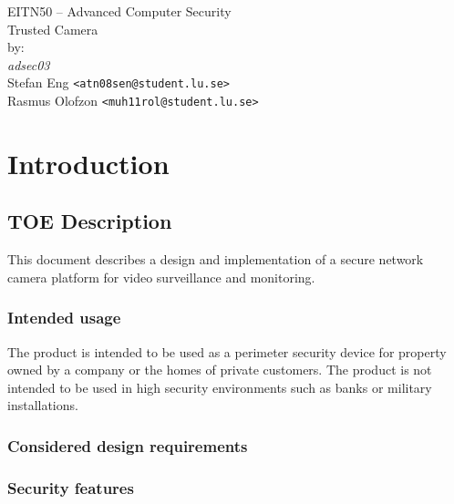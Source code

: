 \documentclass[10pt]{article}
\begin{document}

  \thispagestyle{empty}
  \vspace*{3cm}
  \begin{center}
    \huge{EITN50 -- Advanced Computer Security} \\
    \vspace{0.3cm}
    \LARGE{Trusted Camera} \\
    \vspace{1cm}
    \large{by: \\ \vspace{0.2cm}
	\textit{adsec03} \\
        Stefan Eng \texttt{<atn08sen@student.lu.se>} \\
        Rasmus Olofzon \texttt{<muh11rol@student.lu.se>}
        } \\
  \end{center}


  \newpage

  \section{Introduction}

    \subsection{TOE Description}

      This document describes a design and implementation of a secure network
      camera platform for video surveillance and monitoring.

      \subsubsection{Intended usage}

        The product is intended to be used as a perimeter security device for
        property owned by a company or the homes of private customers. The
        product is not intended to be used in high security environments such
        as banks or military installations.

      \subsubsection{Considered design requirements}

      \subsubsection{Security features}
\end{document}
